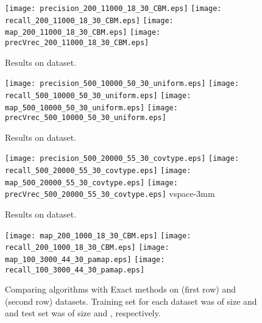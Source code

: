 \documentclass{sig-alternate}
\newlength{\figsize} \setlength{\figsize}{0.22\textwidth}
\begin{document}
\begin{figure}[t!]
\begin{centering}
\texttt{[image: precision\_200\_11000\_18\_30\_CBM.eps]}
\texttt{[image: recall\_200\_11000\_18\_30\_CBM.eps]}
\texttt{[image: map\_200\_11000\_18\_30\_CBM.eps]}
\texttt{[image: precVrec\_200\_11000\_18\_30\_CBM.eps]}
\vspace{-3mm}
\caption{\label{fig:cbm}
Results on  dataset.}  
\vspace{-2mm}
\end{centering}
\end{figure}


\begin{figure}[t!]
\begin{centering}
\texttt{[image: precision\_500\_10000\_50\_30\_uniform.eps]}
\texttt{[image: recall\_500\_10000\_50\_30\_uniform.eps]}
\texttt{[image: map\_500\_10000\_50\_30\_uniform.eps]}
\texttt{[image: precVrec\_500\_10000\_50\_30\_uniform.eps]}
\vspace{-3mm}
\caption{\label{fig:uniform}
Results on  dataset.}  
\vspace{-2mm}
\end{centering}
\end{figure}


\begin{figure}[t!]
\begin{centering}
\texttt{[image: precision\_500\_20000\_55\_30\_covtype.eps]}
\texttt{[image: recall\_500\_20000\_55\_30\_covtype.eps]}
\texttt{[image: map\_500\_20000\_55\_30\_covtype.eps]}
\texttt{[image: precVrec\_500\_20000\_55\_30\_covtype.eps]}
vspace{-3mm}
\caption{\label{fig:covtype}
Results on  dataset.}  
\vspace{-2mm}
\end{centering}
\end{figure}


\begin{figure}[t!]
\begin{centering}
\texttt{[image: map\_200\_1000\_18\_30\_CBM.eps]}
\texttt{[image: recall\_200\_1000\_18\_30\_CBM.eps]}
\texttt{[image: map\_100\_3000\_44\_30\_pamap.eps]}
\texttt{[image: recall\_100\_3000\_44\_30\_pamap.eps]}
\vspace{-3mm}
\caption{\label{fig:exact_cbm_pamap}
Comparing algorithms with Exact methods on  (first row) and  (second row) datasets. Training set for each dataset was of size  and  and test set was of size  and , respectively.}  
\vspace{-2mm}
\end{centering}
\end{figure}
\end{document}
